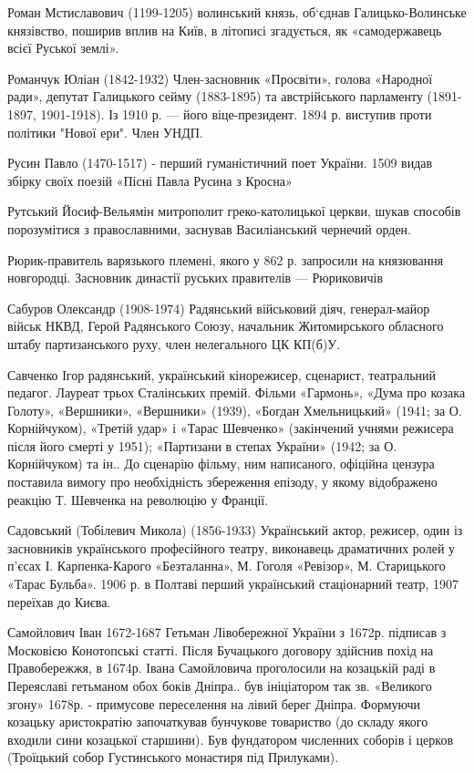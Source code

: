 Роман Мстиславович (1199-1205) волинський князь, об‘єднав Галицько-Волинське князівство, поширив вплив на Київ, в літописі згадується, як «самодержавець всієї Руської землі».

Романчук Юліан  (1842-1932) Член-засновник «Просвіти», голова «Народної ради», депутат Галицького сейму (1883-1895) та австрійського парламенту (1891-1897, 1901-1918). Із 1910 р. --- його віце-президент. 1894 р. виступив проти політики "Нової ери". Член УНДП.

Русин Павло (1470-1517)   - перший гуманістичний поет України. 1509 видав збірку своїх поезій «Пісні Павла Русина з Кросна» 

Рутський Йосиф-Вельямін  митрополит греко-католицької церкви, шукав способів порозумітися з православними, заснував Василіанський чернечий орден.

Рюрик-правитель варязького племені, якого у 862 р. запросили на князювання новгородці. Засновник династії руських правителів --- Рюриковичів

Сабуров Олександр (1908-1974) Радянський військовий діяч, генерал-майор військ НКВД, Герой Радянського Союзу, начальник Житомирсь­кого обласного штабу партизанського руху, член нелегального ЦК КП(б)У.

Савченко Ігор радянський, український кінорежисер, сценарист, театральний педагог.  Лауреат трьох Сталінських премій. Фільми «Гармонь», «Дума про козака Голоту», «Вершники», «Вершники» (1939), «Богдан Хмельницький» (1941; за О. Корнійчуком), «Третій удар» і «Тарас Шевченко» (закінчений учнями режисера після його смерті у 1951); «Партизани в степах України» (1942; за О. Корнійчуком) та ін.. До сценарію фільму, ним написаного, офіційна цензура поставила вимогу про необхідність збереження епізоду, у якому відображено реакцію Т. Шевченка на революцію у Франції. 

Садовський (Тобілевич Микола) (1856-1933) Український актор, режисер, один із засновників українського професійного театру, виконавець драматичних ролей у п’єсах І. Карпенка-Карого «Безталанна», М. Гоголя «Ревізор», М. Старицького «Тарас Бульба». 1906 р. в Полтаві перший український стаціонарний театр, 1907 переїхав до Києва.

Самойлович Іван  1672-1687 Гетьман Лівобережної України з 1672р. підписав з Московією Конотопські статті. Після Бучацького договору здійснив похід на Правобережжя, в 1674р. Івана Самойловича проголосили на козацькій раді в Переяславі гетьманом обох боків Дніпра.. був ініціатором так зв. «Великого згону» 1678р. - примусове переселення на лівий берег Дніпра. Формуючи козацьку аристократію започаткував бунчукове товариство (до складу якого входили сини козацької старшини). Був фундатором численних соборів і церков (Троїцький собор Густинського монастиря під Прилуками).

